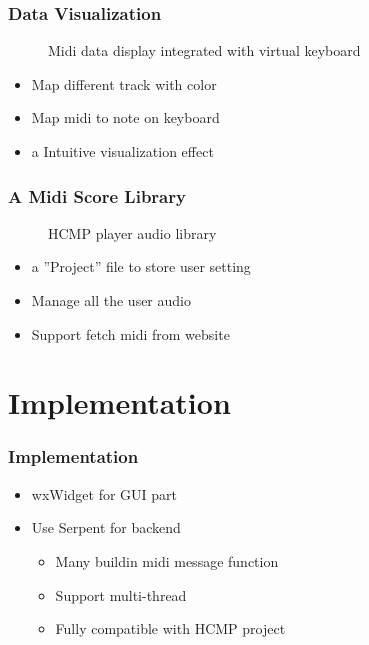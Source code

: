 \documentclass[t]{beamer}
\begin{document}
\begin{frame}
\frametitle{Data Visualization}
\begin{figure}[H] %
\caption{Midi data display integrated with virtual keyboard}
\label{fig:speciation}
\end{figure}

\begin{itemize}
  \item Map different track with color 
  \item Map midi to note on keyboard  
  \item a Intuitive visualization effect 
\end{itemize}

\end{frame}

\begin{frame}
\frametitle{A Midi Score Library}
\begin{figure}[H] %
\caption{HCMP player audio library}
\label{fig:speciation}
\end{figure}

\begin{itemize}
  \item a ''Project'' file to store user setting 
  \item Manage all the user audio  
  \item Support fetch midi from website  
\end{itemize}
\end{frame}

\section{Implementation}
\begin{frame}
\frametitle{Implementation}
\begin{itemize}
  \item wxWidget for GUI part   
  \item Use Serpent for backend  
  \begin{itemize}
    \item Many buildin midi message function 
    \item Support multi-thread 
    \item Fully compatible with HCMP project
  \end{itemize}
\end{itemize}
\end{frame}
\end{document}
